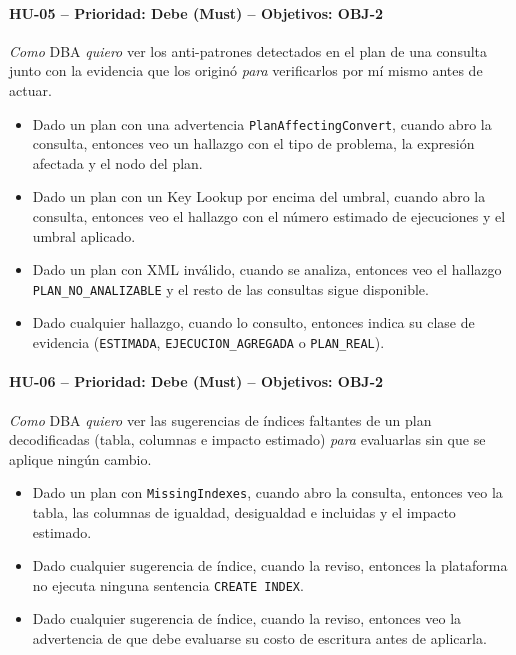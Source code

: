 \documentclass[11pt,a4paper]{report}
\begin{document}
\paragraph{HU-05 -- Prioridad: Debe (Must) -- Objetivos: OBJ-2}
\textit{Como} DBA \textit{quiero} ver los anti-patrones detectados en el plan de una consulta junto con la evidencia que los originó \textit{para} verificarlos por mí mismo antes de actuar.
\begin{itemize}[leftmargin=1.3em,itemsep=1pt]
\item[\textbf{CA-HU05.1}] Dado un plan con una advertencia \texttt{PlanAffectingConvert}, cuando abro la consulta, entonces veo un hallazgo con el tipo de problema, la expresión afectada y el nodo del plan.
\item[\textbf{CA-HU05.2}] Dado un plan con un Key Lookup por encima del umbral, cuando abro la consulta, entonces veo el hallazgo con el número estimado de ejecuciones y el umbral aplicado.
\item[\textbf{CA-HU05.3}] Dado un plan con XML inválido, cuando se analiza, entonces veo el hallazgo \texttt{PLAN\_NO\_ANALIZABLE} y el resto de las consultas sigue disponible.
\item[\textbf{CA-HU05.4}] Dado cualquier hallazgo, cuando lo consulto, entonces indica su clase de evidencia (\texttt{ESTIMADA}, \texttt{EJECUCION\_AGREGADA} o \texttt{PLAN\_REAL}).
\end{itemize}

\paragraph{HU-06 -- Prioridad: Debe (Must) -- Objetivos: OBJ-2}
\textit{Como} DBA \textit{quiero} ver las sugerencias de índices faltantes de un plan decodificadas (tabla, columnas e impacto estimado) \textit{para} evaluarlas sin que se aplique ningún cambio.
\begin{itemize}[leftmargin=1.3em,itemsep=1pt]
\item[\textbf{CA-HU06.1}] Dado un plan con \texttt{MissingIndexes}, cuando abro la consulta, entonces veo la tabla, las columnas de igualdad, desigualdad e incluidas y el impacto estimado.
\item[\textbf{CA-HU06.2}] Dado cualquier sugerencia de índice, cuando la reviso, entonces la plataforma no ejecuta ninguna sentencia \texttt{CREATE INDEX}.
\item[\textbf{CA-HU06.3}] Dado cualquier sugerencia de índice, cuando la reviso, entonces veo la advertencia de que debe evaluarse su costo de escritura antes de aplicarla.
\end{itemize}
\end{document}
